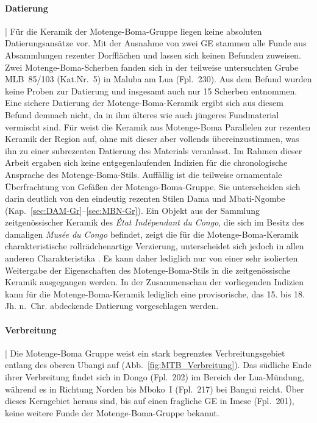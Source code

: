 \paragraph{Datierung}\hspace{-.5em}|\hspace{.5em}%
Für die Keramik der Motenge-Boma-Gruppe liegen keine absoluten Datierungsansätze vor. Mit der Ausnahme von zwei GE stammen alle Funde aus Absammlungen rezenter Dorfflächen und lassen sich keinen Befunden zuweisen. Zwei Motenge-Boma-Scherben fanden sich in der teilweise untersuchten Grube MLB~85/103 (Kat.Nr.~5) in Maluba am Lua (Fpl.~230). Aus dem Befund wurden keine Proben zur Datierung und insgesamt auch nur 15 Scherben entnommen. Eine sichere Datierung der Motenge-Boma-Keramik ergibt sich aus diesem Befund demnach nicht, da in ihm älteres wie auch jüngeres Fundmaterial vermischt sind. Für \textcite[69]{vanNoten.1982d} weist die Keramik aus Motenge-Boma Parallelen zur rezenten Keramik der Region auf, ohne mit dieser aber vollends übereinzustimmen, was ihn zu einer subrezenten Datierung des Materials veranlasst. Im Rahmen dieser Arbeit ergaben sich keine entgegenlaufenden Indizien für die chronologische Ansprache des Motenge-Boma-Stils. Auffällig ist die teilweise ornamentale Überfrachtung von Gefäßen der Motengo-Boma-Gruppe. Sie unterscheiden sich darin deutlich von den eindeutig rezenten Stilen Dama und Mbati-Ngombe (Kap.~\ref{sec:DAM-Gr}--\ref{sec:MBN-Gr}). Ein Objekt aus der Sammlung zeitgenössischer Keramik des \textit{État Indépendant du Congo}, die sich im Besitz des damaligen \textit{Musée du Congo} befindet, zeigt die für die Motenge-Boma-Keramik charakteristische rollrädchenartige Verzierung, unterscheidet sich jedoch in allen anderen Charakteristika \parencite[Taf.~XIV.204]{Coart.1907}. Es kann daher lediglich nur von einer sehr isolierten Weitergabe der Eigenschaften des Motenge-Boma-Stils in die zeitgenössische Keramik ausgegangen werden. In der Zusammenschau der vorliegenden Indizien kann für die Motenge-Boma-Keramik lediglich eine provisorische, das 15. bis 18. Jh. n.~Chr. abdeckende Datierung vorgeschlagen werden.


\paragraph{Verbreitung}\hspace{-.5em}|\hspace{.5em}%
Die Motenge-Boma Gruppe weist ein stark begrenztes Verbreitungsgebiet entlang des oberen \mbox{Ubangi} auf (Abb.~\ref{fig:MTB_Verbreitung}). Das südliche Ende ihrer Verbreitung findet sich in \mbox{Dongo} (Fpl.~202) im Bereich der Lua-Mündung, während es in Richtung Norden bis Mboko~I (Fpl.~217) bei Bangui reicht. Über dieses Kerngebiet heraus sind, bis auf einen fragliche GE in Imese (Fpl.~201), keine weitere Funde der Motenge-Boma-Gruppe bekannt.
